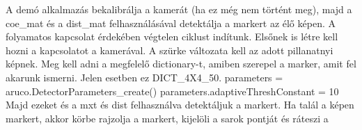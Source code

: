 


A demó alkalmazás bekalibrálja a kamerát (ha ez még nem történt meg), majd a coe_mat és a dist_mat felhasználásával detektálja a markert az élő képen.
A folyamatos kapcsolat érdekében végtelen ciklust indítunk. 
Elsőnek is létre kell hozni a kapcsolatot a kamerával. A szürke változata kell az adott pillanatnyi képnek. Meg kell adni a megfelelő dictionary-t, amiben szerepel a marker, amit fel akarunk ismerni. Jelen esetben ez DICT_4X4_50. 
parameters = aruco.DetectorParameters_create()
parameters.adaptiveThreshConstant = 10
Majd ezeket és a mxt és dist felhasználva detektáljuk a markert.
Ha talál a képen markert, akkor körbe rajzolja a markert, kijelöli a sarok pontját és ráteszi a 